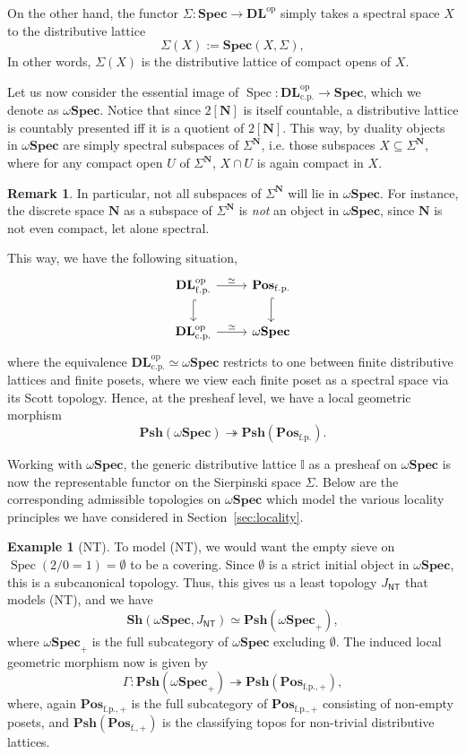 \documentclass[12pt]{amsart}
\theoremstyle{definition}
\newtheorem{example}[theorem]{Example}
\newtheorem{remark}[theorem]{Remark}
\newcommand{\mb}[1]{\mathbf{#1}}
\newcommand{\mbb}[1]{\mathbb{#1}}
\newcommand{\I}{\mbb I}
\newcommand{\mr}[1]{\mathrm{#1}}
\newcommand{\ms}[1]{\mathsf{#1}}
\newcommand{\Pos}{\mb{Pos}}
\newcommand{\DL}{\mb{DL}}
\newcommand{\sh}{\mb{Sh}}
\newcommand{\psh}{\mb{Psh}}
\newcommand{\op}{^{\mathrm{op}}}
\newcommand{\surj}{\twoheadrightarrow}
\newcommand{\fp}{_{\mr{f.p.}}}
\newcommand{\cp}{_{\mr{c.p.}}}
\newcommand{\N}{\mb N}
\newcommand{\emp}{\emptyset}
\newcommand{\Spec}{\mb{Spec}}
\newcommand{\wSpec}{\omega\mb{Spec}}
\newcommand{\spec}{\operatorname{Spec}}
\begin{document}
On the other hand, the functor $\Sigma : \Spec \to \DL\op$ simply takes a spectral space $X$ to the distributive lattice 
\[ \Sigma(X) := \Spec(X,\Sigma), \]
In other words, $\Sigma(X)$ is the distributive lattice of compact opens of $X$.

Let us now consider the essential image of $\spec : \DL\cp\op \to \Spec$, which we denote as $\wSpec$. Notice that since $2[\N]$ is itself countable, a distributive lattice is countably presented iff it is a quotient of $2[\N]$. This way, by duality objects in $\wSpec$ are simply spectral subspaces of $\Sigma^\N$, i.e. those subspaces $X \subseteq \Sigma^\N$, where for any compact open $U$ of $\Sigma^\N$, $X \cap U$ is again compact in $X$. 

\begin{remark}
  In particular, not all subspaces of $\Sigma^\N$ will lie in $\wSpec$. For instance, the discrete space $\N$ as a subspace of $\Sigma^\N$ is \emph{not} an object in $\wSpec$, since $\N$ is not even compact, let alone spectral.
\end{remark}

This way, we have the following situation,
\[
\begin{tikzcd}
  \DL\fp\op \ar[r, "\simeq"] \ar[d, hook] & \Pos\fp \ar[d, hook] \\ 
  \DL\cp\op \ar[r, "\simeq"] & \wSpec 
\end{tikzcd}
\]
where the equivalence $\DL\cp\op \simeq \wSpec$ restricts to one between finite distributive lattices and finite posets, where we view each finite poset as a spectral space via its Scott topology. Hence, at the presheaf level, we have a local geometric morphism
\[ \psh(\wSpec) \surj \psh(\Pos\fp). \]

Working with $\wSpec$, the generic distributive lattice $\I$ as a presheaf on $\wSpec$ is now the representable functor on the Sierpinski space $\Sigma$. Below are the corresponding admissible topologies on $\wSpec$ which model the various locality principles we have considered in Section~\ref{sec:locality}.

\begin{example}[NT]
  To model (NT), we would want the empty sieve on $\spec(2/0=1) = \emp$ to be a covering. Since $\emp$ is a strict initial object in $\wSpec$, this is a subcanonical topology. Thus, this gives us a least topology $J_{\ms{NT}}$ that models (NT), and we have
  \[ \sh(\wSpec,J_{\ms{NT}}) \simeq \psh(\wSpec_+), \]
  where $\wSpec_+$ is the full subcategory of $\wSpec$ excluding $\emp$. The induced local geometric morphism now is given by 
  \[ \Gamma : \psh(\wSpec_+) \surj \psh(\Pos_{\mr{f.p.,+}}), \]
  where, again $\Pos_{\mr{f.p.,+}}$ is the full subcategory of $\Pos_{\mr{f.p.,+}}$ consisting of non-empty posets, and $\psh(\Pos_{\mr{f.,+}})$ is the classifying topos for non-trivial distributive lattices.
\end{example}
\end{document}
